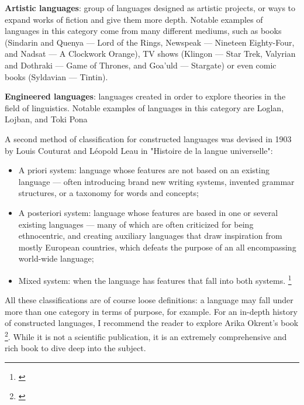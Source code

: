 \textbf{Artistic languages}: group of languages designed as artistic projects, or ways to expand works of fiction and give them more depth. Notable examples of languages
in this category come from many different mediums, such as books (Sindarin and Quenya --- Lord of the Rings, Newspeak --- Nineteen Eighty-Four, and  Nadsat --- A Clockwork Orange),
TV shows (Klingon --- Star Trek, Valyrian and Dothraki --- Game of Thrones, and Goa'uld --- Stargate) or even comic books (Syldavian --- Tintin).\newline

\textbf{Engineered languages}: languages created in order to explore theories in the field of linguistics. Notable examples of languages in this category are Loglan, Lojban, and Toki Pona\newline

A second method of classification for constructed languages was devised in 1903 by Louis Couturat and Léopold Leau in "Histoire de la langue universelle":

\begin{itemize}
    \setlength\itemsep{-0.5em}
    \item A priori system: language whose features are not based on an existing language --- often introducing brand new writing systems, invented grammar structures,
    or a taxonomy for words and concepts;
    \item A posteriori system: language whose features are based in one or several existing languages --- many of which are often criticized for being ethnocentric, and
    creating auxiliary languages that draw inspiration from mostly European countries, which defeats the purpose of an all encompassing world-wide language;
    \item Mixed system: when the language has features that fall into both systems. \footnote{\cite[Introduction, Pages XXVII and XXVIII]{couturat1903histoire}}
\end{itemize}

\newpage
All these classifications are of course loose definitions: a language may fall under more than one category in terms of purpose, for example. For an in-depth history of
constructed languages, I recommend the reader to explore Arika Okrent's book \footnote{\cite{okrent2009land}}. While it is not a scientific publication, it is an extremely
comprehensive and rich book to dive deep into the subject.\newline

